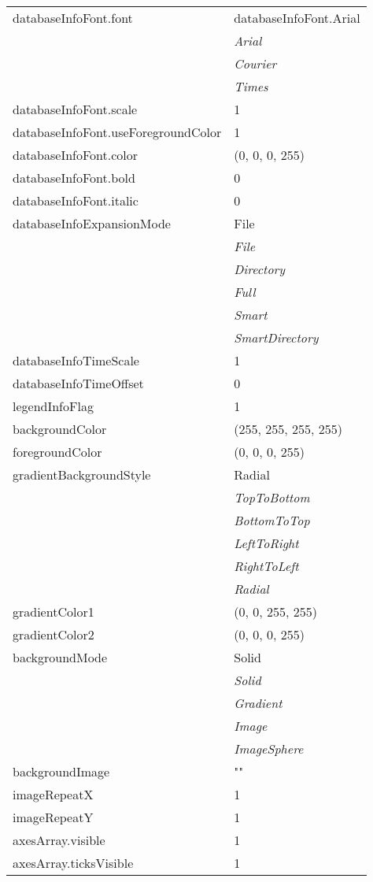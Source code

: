 \documentclass[10pt,a4paper]{report}
\begin{document}
\begin{longtable}{ll}
databaseInfoFont.font  &  databaseInfoFont.Arial   \\
 & {\it  Arial} \\
 & {\it  Courier} \\
 & {\it  Times} \\
databaseInfoFont.scale  &  1 \\
databaseInfoFont.useForegroundColor  &  1 \\
databaseInfoFont.color  &  (0, 0, 0, 255) \\
databaseInfoFont.bold  &  0 \\
databaseInfoFont.italic  &  0 \\
databaseInfoExpansionMode  &  File   \\
 & {\it  File} \\
 & {\it  Directory} \\
 & {\it  Full} \\
 & {\it  Smart} \\
 & {\it  SmartDirectory} \\
databaseInfoTimeScale  &  1 \\
databaseInfoTimeOffset  &  0 \\
legendInfoFlag  &  1 \\
backgroundColor  &  (255, 255, 255, 255) \\
foregroundColor  &  (0, 0, 0, 255) \\
gradientBackgroundStyle  &  Radial   \\
 & {\it  TopToBottom} \\
 & {\it  BottomToTop} \\
 & {\it  LeftToRight} \\
 & {\it  RightToLeft} \\
 & {\it  Radial} \\
gradientColor1  &  (0, 0, 255, 255) \\
gradientColor2  &  (0, 0, 0, 255) \\
backgroundMode  &  Solid   \\
 & {\it  Solid} \\
 & {\it  Gradient} \\
 & {\it  Image} \\
 & {\it  ImageSphere} \\
backgroundImage  &  "" \\
imageRepeatX  &  1 \\
imageRepeatY  &  1 \\
axesArray.visible  &  1 \\
axesArray.ticksVisible  &  1 \\

\end{longtable}
\end{document}
